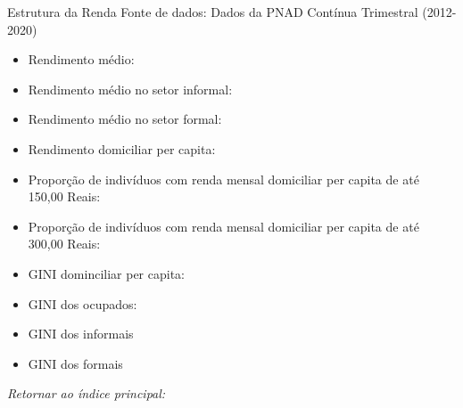 \begin{frame}[label=_estrutura_renda]{Estrutura da Renda}
{\footnotesize Fonte de dados: Dados da PNAD Contínua Trimestral (2012-2020)}
\begin{footnotesize}
\begin{itemize}
\item{Rendimento médio: \hyperlink{_estrutura_renda_rendimento_medio_total}{}}
\item{Rendimento médio no setor informal: \hyperlink{_estrutura_renda_rendimento_medio_informal}{}}
\item{Rendimento médio no setor formal: \hyperlink{_estrutura_renda_rendimento_medio_formal}{}}
\item{Rendimento domiciliar per capita: \hyperlink{_estrutura_renda_rendimento_domiciliar_pc}{}}

\item{Proporção de indivíduos com renda mensal domiciliar per capita de até 150,00 Reais: \hyperlink{_estrutura_renda_prop_rendimento_domiciliar_150}{}}


\item{Proporção de indivíduos com renda mensal domiciliar per capita de até 300,00 Reais: \hyperlink{_estrutura_renda_prop_rendimento_domiciliar_300}{}}

\item{GINI dominciliar per capita: \hyperlink{_estrutura_renda_gini_rendimento_domiciliar_pc}{}}
\item{GINI dos ocupados: \hyperlink{_estrutura_renda_gini_ocupado}{}}
\item{GINI dos informais \hyperlink{_estrutura_renda_gini_informal}{}}
\item{GINI dos formais \hyperlink{_estrutura_renda_gini_formal}{}}
\end{itemize}
\end{footnotesize}

\begin{small}
\textit{Retornar ao índice principal: \hyperlink{indice_principal}{} }
\end{small}

\end{frame}


